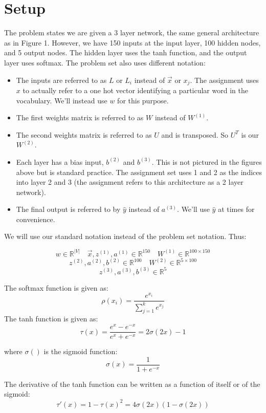 \documentclass[]{article}
\begin{document}
\section{Setup}
The problem states we are given a 3 layer network, the same general architecture as in Figure 1. However, we have 150 inputs at the input layer, 100 hidden nodes, and 5 output nodes. The hidden layer uses the tanh function, and the output layer uses softmax. The problem set also uses different notation:
\begin{itemize}
	\item The inputs are referred to as $L$ or $L_i$ instead of $\vec{x}$ or $x_j$. The assignment uses $x$ to actually refer to a one hot vector identifying a particular word in the vocabulary. We'll instead use $w$ for this purpose.
	\item The first weights matrix is referred to as $W$ instead of $W^{(1)}$.
	\item The second weights matrix is referred to as $U$ and is transposed. So $U^T$ is our $W^{(2)}$.
	\item Each layer has a bias input, $b^{(2)}$ and $b^{(3)}$. This is not pictured in the figures above but is standard practice. The assignment set uses 1 and 2 as the indices into layer 2 and 3 (the assignment refers to this architecture as a 2 layer network).
	\item The final output is referred to by $\hat{y}$ instead of $a^{(3)}$. We'll use $\hat{y}$ at times for convenience.
\end{itemize}
	
We will use our standard notation instead of the problem set notation. Thus:

$$w \in \mathbb{R}^{|V|} \quad \vec{x},z^{(1)},a^{(1)} \in \mathbb{R}^{150} \quad W^{(1)} \in \mathbb{R}^{100\times150} $$
$$z^{(2)},a^{(2)},b^{(2)} \in \mathbb{R}^{100} \quad W^{(2)} \in \mathbb{R}^{5\times100}$$
$$z^{(3)},a^{(3)},b^{(3)} \in \mathbb{R}^5$$
\newline

The softmax function is given as:
$$\rho(x_i) = \frac{e^{x_i}}{\sum_{j=1}^k e^{x_j}}$$
The tanh function is given as: 
$$\tau(x) =\frac{e^x - e^{-x}}{e^x + e^{-x}} = 2\sigma(2x) - 1$$

where $\sigma()$ is the sigmoid function:
$$\sigma(x) = \frac{1}{1 + e^{-x}}$$

The derivative of the tanh function can be written as a function of itself or of the sigmoid:
$$ \tau'(x) = 1 - \tau(x)^2 = 4\sigma(2x)(1-\sigma(2x))$$
\end{document}
